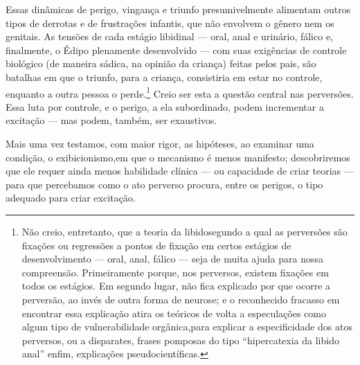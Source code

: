 Essas dinâmicas de perigo, vingança e triunfo presumivelmente
alimentam outros tipos de derrotas e de frustrações infantis, que não
envolvem o gênero nem os genitais. As tensões de cada estágio libidinal\idxlibid{}
--- oral, anal e urinário, fálico e, finalmente, o Édipo plenamente
desenvolvido --- com suas exigências de controle biológico (de maneira
sádica, na opinião da criança) feitas pelos pais, são batalhas em que o
triunfo, para a criança, consistiria em estar no controle, enquanto a
outra pessoa o perde.\footnote{ Não creio, entretanto, que a teoria da
libido\idxlibid[|nn] segundo a qual as perversões são fixações ou regressões a pontos
de fixação em certos estágios de desenvolvimento --- oral, anal,
fálico --- seja de muita ajuda para nossa compreensão. Primeiramente
porque, nos perversos, existem fixações em todos os estágios. Em
segundo lugar, não fica explicado por que ocorre a perversão, ao invés
de outra forma de neurose; e o reconhecido fracasso em encontrar essa
explicação atira os teóricos de volta a especulações como algum tipo
de vulnerabilidade orgânica,\idxvulne[|nn] para explicar a especificidade dos atos
perversos, ou a disparates, frases pomposas do tipo
``hipercatexia da libido anal'' enfim,
explicações pseudocientíficas.} Creio ser esta a questão central nas
perversões. Essa luta por controle, e o perigo, a ela subordinado,
podem incrementar a excitação --- mas podem, também, ser exaustivos.

Mais uma vez testamos, com maior rigor, as hipóteses, ao examinar
uma condição, o exibicionismo,\idxexibi[|(] em que o mecanismo é menos manifesto;
descobriremos que ele requer ainda menos habilidade clínica --- ou
capacidade de criar teorias --- para que percebamos como o ato
perverso procura, entre os perigos, o tipo adequado para criar
excitação.

